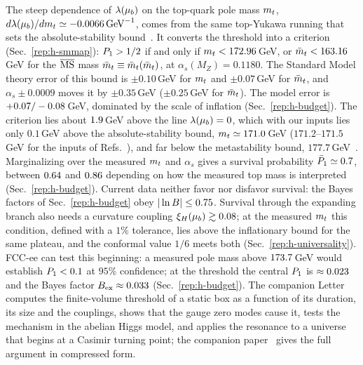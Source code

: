 The steep dependence of $\lambda(\mu_b)$ on the top-quark pole mass $m_t$, $d\lambda(\mu_b)/dm_t\simeq-0.0066\,{\rm GeV}^{-1}$, comes from the same top-Yukawa running that sets the absolute-stability bound~\cite{Degrassi:2012ry,Buttazzo:2013uya,Bednyakov:2015sca}. %
It converts the threshold into a criterion (Sec.~\ref{rep:h-smmap}): $P_1>1/2$ if and only if $m_t<172.96$\,GeV, or $\bar m_t<163.16$\,GeV for the $\overline{\mathrm{MS}}$ mass $\bar m_t\equiv\bar m_t(\bar m_t)$, at $\alpha_s(M_Z)=0.1180$. %
The Standard Model theory error of this bound is $\pm0.10$\,GeV for $m_t$ and $\pm0.07$\,GeV for $\bar m_t$, and $\alpha_s\pm0.0009$ moves it by $\pm0.35$\,GeV ($\pm0.25$\,GeV for $\bar m_t$). %
The model error is $+0.07/-0.08$\,GeV, dominated by the scale of inflation (Sec.~\ref{rep:h-budget}). %
The criterion lies about $1.9$\,GeV above the line $\lambda(\mu_b)=0$, which with our inputs lies only $0.1$\,GeV above the absolute-stability bound, $m_t\simeq171.0$\,GeV ($171.2$--$171.5$\,GeV for the inputs of Refs.~\cite{Buttazzo:2013uya,Bednyakov:2015sca,Andreassen:2017rzq}), and far below the metastability bound, $177.7$\,GeV~\cite{Andreassen:2017rzq}. %
Marginalizing over the measured $m_t$ and $\alpha_s$ gives a survival probability $\bar P_1\simeq0.7$, between $0.64$ and $0.86$ depending on how the measured top mass is interpreted (Sec.~\ref{rep:h-budget}).
Current data neither favor nor disfavor survival: the Bayes factors of Sec.~\ref{rep:h-budget} obey $|\ln B|\leq0.75$.
Survival through the expanding branch also needs a curvature coupling $\xi_H(\mu_b)\gtrsim0.08$; at the measured $m_t$ this condition, defined with a $1\%$ tolerance, lies above the inflationary bound for the same plateau, and the conformal value $1/6$ meets both (Sec.~\ref{rep:h-universality}).
FCC-ee can test this beginning: a measured pole mass above $173.7$\,GeV would establish $P_1<0.1$ at $95\%$ confidence; at the threshold the central $P_1$ is $\approx0.023$ and the Bayes factor $B_{\rm ex}\approx0.033$ (Sec.~\ref{rep:h-budget}). %
The companion Letter~\cite{v12PRL} computes the finite-volume threshold of a static box as a function of its duration, its size and the couplings, shows that the gauge zero modes cause it, tests the mechanism in the abelian Higgs model, and applies the resonance to a universe that begins at a Casimir turning point; the companion paper~\cite{v12PRD} gives the full argument in compressed form.

